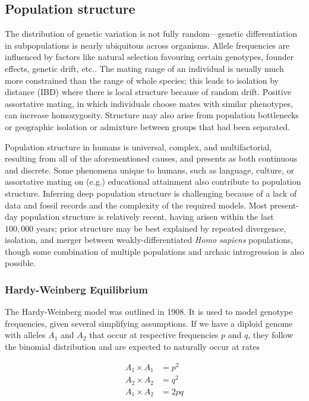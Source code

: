 \subsection{Population structure}

The distribution of genetic variation is not fully random---genetic differentiation in subpopulations is nearly ubiquitous across organisms. Allele frequencies are influenced by factors like natural selection favouring certain genotypes, founder effects, genetic drift, etc.\citep{hartl2007principles_6}. The mating range of an individual is usually much more constrained than the range of whole species; this leads to isolation by distance (IBD) where there is local structure because of random drift\citep{wright_isolation_1943}. Positive assortative mating, in which individuals choose mates with similar phenotypes, can increase homozygosity\citep{hartl2007principles_6}. Structure may also arise from population bottlenecks or geographic isolation\citep{crow_kimura_1970_3} or admixture between groups that had been separated\citep{crow_kimura_1970_9}. 

Population structure in humans is universal, complex, and multifactorial, resulting from all of the aforementioned causes, and presents as both continuous and discrete\citep{peter_geometric_2022}. Some phenomena unique to humans, such as language\citep{barbujani_zones_1990}, culture\citep{campbell_evolution_2010}, or assortative mating on (e.g.) educational attainment\citep{robinson_genetic_2017} also contribute to population structure. Inferring deep population structure is challenging because of a lack of data and fossil records and the complexity of the required models. Most present-day population structure is relatively recent, having arisen within the last $100,000$ years; prior structure may be best explained by repeated divergence, isolation, and merger between weakly-differentiated \textit{Homo sapiens} populations, though some combination of multiple populations and archaic introgression is also possible\citep{ragsdale_weakly_2023}.

\subsubsection{Hardy-Weinberg Equilibrium}

The Hardy-Weinberg model was outlined in 1908. It is used to model genotype frequencies, given several simplifying assumptions\citep{hartl2007principles_2}. If we have a diploid genome with alleles $A_{1}$ and $A_{2}$ that occur at respective frequencies $p$ and $q$, they follow the binomial distribution and are expected to naturally occur at rates
\begin{spacing}{1}
\begin{align*} 
A_{1} \times A_{1} &= p^{2}\\
A_{2} \times A_{2} &= q^{2}\\
A_{1} \times A_{2} &= 2pq
\end{align*} 
\end{spacing}

